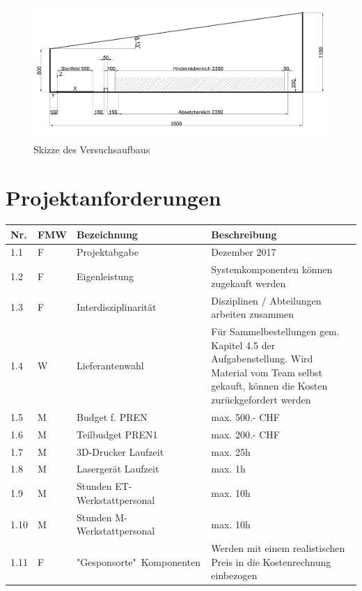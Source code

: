 \documentclass[a4paper]{report}
\begin{document}
\begin{figure}[h!]
	\includegraphics[keepaspectratio,width=\textwidth]{PrenFunktionsskizze}
	\caption{Skizze des Versuchsaufbaus}
	\label{fig:Funktionsskizze}
\end{figure}

\section{Projektanforderungen}
\begin{tabular}{|p{}|p{}|p{}|p{}|}
	\hline
	\textbf{Nr.} & \textbf{FMW\footnotemark} & \textbf{Bezeichnung} & \textbf{Beschreibung} \\
	\hline
	1.1 & F & Projektabgabe & Dezember 2017 \\
	\hline
	1.2 & F & Eigenleistung & Systemkomponenten können zugekauft werden \\
	\hline
	1.3 & F & Interdisziplinarität & Disziplinen / Abteilungen arbeiten zusammen \\
	\hline
	1.4 & W & Lieferantenwahl & Für Sammelbestellungen gem. Kapitel 4.5 der Aufgabenstellung. Wird Material vom Team selbst gekauft, können die Kosten zurückgefordert werden \\
	\hline
	1.5 & M & Budget f. PREN & max. 500.- CHF \\
	\hline
	1.6 & M & Teilbudget PREN1 & max. 200.- CHF \\
	\hline
	1.7 & M & 3D-Drucker Laufzeit & max. 25h \\
	\hline
	1.8 & M & Lasergerät Laufzeit & max. 1h \\
	\hline
	1.9 & M & Stunden ET-Werkstattpersonal & max. 10h \\
	\hline
	1.10 & M & Stunden M-Werkstattpersonal & max. 10h \\
	\hline
	1.11 & F & "Gesponsorte"\ Komponenten & Werden mit einem realistischen Preis in die Kostenrechnung einbezogen \\
	\hline
\end{tabular}
\end{document}
